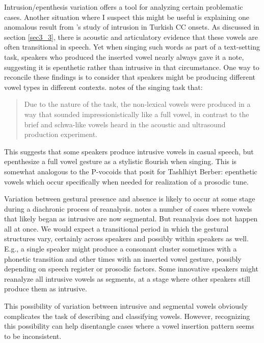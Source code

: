 \documentclass[output=paper,colorlinks,citecolor=brown]{langscibook}
\begin{document}
Intrusion\slash epenthesis variation offers a tool for analyzing certain problematic cases. Another situation where I suspect this might be useful is explaining one anomalous result from \citet{Bellik2019a}'s study of intrusion in Turkish CC onsets. As discussed in section \ref{sec3_3}, there is acoustic and articulatory evidence that these vowels are often transitional in speech. Yet when singing such words as part of a text-setting task, speakers who produced the inserted vowel nearly always gave it a note, suggesting it is epenthetic rather than intrusive in that circumstance. One way to reconcile these findings is to consider that speakers might be producing different vowel types in different contexts. \citet[179]{Bellik2019a} notes of the singing task that:

\begin{quote}
    Due to the nature of the task, the non-lexical vowels were produced in a way that sounded impressionistically like a full vowel, in contrast to the brief and schwa-like vowels heard in the acoustic and ultrasound production experiment.
\end{quote}

\begin{sloppypar}
This suggests that some speakers produce intrusive vowels in casual speech, but epenthesize a full vowel gesture as a stylistic flourish when singing. This is somewhat analogous to the P-vocoids that \citet{ridouane2019story} posit for Tashlhiyt Berber: epenthetic vowels which occur specifically when needed for realization of a prosodic tune.
\end{sloppypar}

Variation between gestural presence and absence is likely to occur at some stage during a diachronic process of reanalysis. \citet{Hall2006} notes a number of cases where vowels that likely began as intrusive are now segmental. But reanalysis does not happen all at once. We would expect a transitional period in which the gestural structures vary, certainly across speakers and possibly within speakers as well. E.g., a single speaker might produce a consonant cluster sometimes with a phonetic transition and other times with an inserted vowel gesture, possibly depending on speech register or prosodic factors. Some innovative speakers might reanalyze all intrusive vowels as segments, at a stage where other speakers still produce them as intrusive. 

This possibility of variation between intrusive and segmental vowels obviously complicates the task of describing and classifying vowels. However, recognizing this possibility can help disentangle cases where a vowel insertion pattern seems to be inconsistent.
\end{document}
